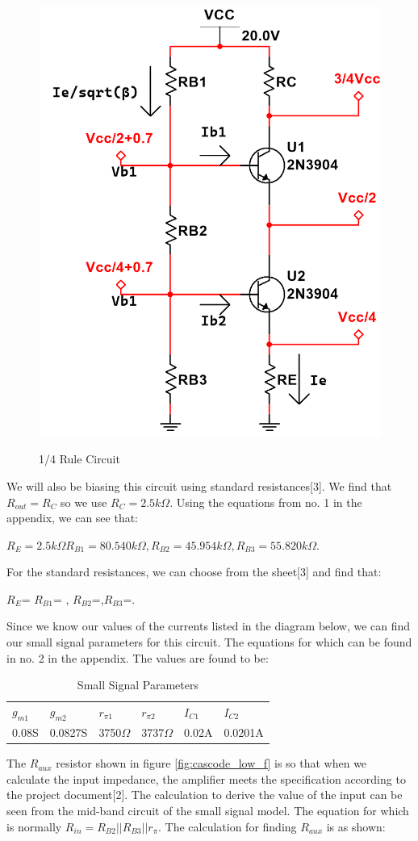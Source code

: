 \documentclass[12pt]{article}
\begin{document}
\begin{figure}[h!]
\centering
\includegraphics[height=0.30\textwidth]{Images/Part_1_biassing.png}\\
\caption{1/4 Rule Circuit}
\label{fig:part1_circuit}
\end{figure}
\FloatBarrier
We will also be biasing this circuit using standard resistances[3]. We find that $R_{out}= R_C$ so we use $R_C=2.5k\Omega$.
\newline
Using the equations from no. 1 in the appendix, we can see that:
\begin{center}
    $R_E=2.5k\Omega R_{B1}= 80.540k\Omega, R_{B2}=45.954k\Omega,R_{B3}=55.820k\Omega$.  
\end{center}
 
For the standard resistances, we can choose from the sheet[3] and find that:

\begin{center}
    $R_E$= $R_{B1}$= , $R_{B2}$=,$R_{B3}$=.  
\end{center}

Since we know our values of the currents listed in the diagram below, we can find our small signal parameters for this circuit. The equations for which can be found in no. 2 in the appendix. The values are found to be:

\begin{table}[h!]
\centering
\begin{tabular}{l|l|l|l|l|l}
$g_{m1}$ & $g_{m2}$ & $r_{\pi1}$   & $r_{\pi2}$   & $I_{C1}$ & $I_{C2}$ \\ \cline{1-6}
0.08S    & 0.0827S  & 3750$\Omega$ & 3737$\Omega$ & 0.02A    & 0.0201A 
\end{tabular}%
\caption{Small Signal Parameters}
\label{Small Signal Model} 
\end{table}


The $R_{aux}$ resistor shown in figure \ref{fig:cascode_low_f} is so that when we calculate the input impedance, the amplifier meets the specification according to the project document[2]. The calculation to derive the value of the input can be seen from the mid-band circuit of the small signal model. The equation for which is normally $R_{in}= R_{B2}||R_{B3}||r_{\pi}$. The calculation for finding $R_{aux}$ is as shown:
\end{document}
